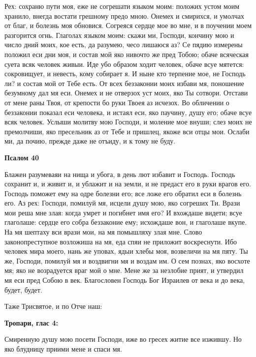 Рех: сохраню пути моя, еже не согрешати языком моим: положих устом моим хранило, внегда востати грешному предо мною. Онемех и смирихся, и умолчах от благ, и болезнь моя обновися. Согреяся сердце мое во мне, и в поучении моем разгорится огнь. Глаголах языком моим: скажи ми, Господи, кончину мою и число дний моих, кое есть, да разумею, чесо лишаюся аз? Се пядию измерены положил еси дни моя, и состав мой яко нивочто же пред Тобою; обаче всяческая суета всяк человек живыи. Иде убо образом ходит человек, обаче всуе мятется: сокровищует, и невесть, кому собирает я. И ныне кто терпение мое, не Господь ли? и состав мой от Тебе есть. От всех беззаконии моих избави мя, поношение безумному дал мя еси. Онемех и не отверзох уст моих, яко Ты сотвори. Отстави от мене раны Твоя, от крепости бо руки Твоея аз исчезох. Во обличении о беззаконии показал еси человека, и истаял еси, яко паучину, душу его; обаче всуе всяк человек. Услыши молитву мою Господи, и моление мое внуши; слез моих не премолчиши, яко пресельник аз от Тебе и пришлец, якоже вси отцы мои. Ослаби ми, да почию, прежде даже не отъиду, и к тому не буду.





\bfseries Псалом 40\normalfont{}


Блажен разумеваяи на нища и убога, в день лют избавит и Господь. Господь сохранит и, и живит и, и ублажит и на земли, и не предаст его в руки врагов его. Господь поможет ему на одре болезни его; все ложе его обратил еси в болезнь его. Аз рех: Господи, помилуй мя, исцели душу мою, яко согреших Ти. Врази мои реша мне злая: когда умрет и погибнет имя его? И вхождаше видети; всуе глаголаше: сердце его собра беззаконие ему; исхождаше вон, и глаголаше вкупе. На мя шептаху вси врази мои, на мя помышляху злая мне. Слово законопреступное возложиша на мя, еда спяи не приложит воскреснути. Ибо человек мира моего, нань же уповах, ядыи хлебы моя, возвеличи на мя пяту. Ты же, Господи, помилуй мя и воздвигни мя и воздам им. О сем познах, яко восхоте мя; яко не возрадуется враг мой о мне. Мене же за незлобие прият, и утвердил мя еси пред Собою в век. Благословен Господь Бог Израилев от века и до века, будет, будет.


Таже Трисвятое, и по Отче наш:





\bfseries Тропари, глас 4:\normalfont{}


Смиренную душу мою посети Господи, иже во гресех житие все изжившу. Но яко блудницу приими мене и спаси мя.


